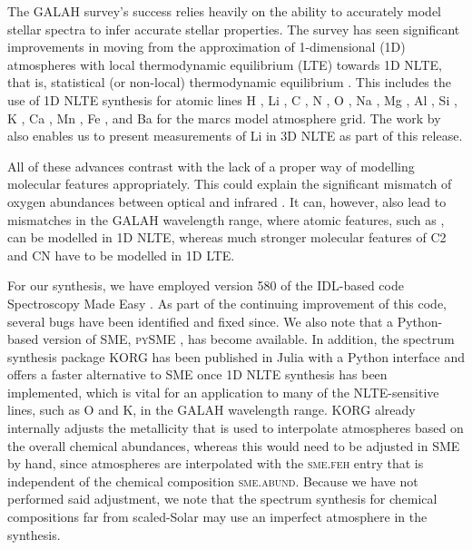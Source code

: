 \documentclass[
  journal=pasa,
  manuscript=research-paper, %
  year=2024,
  volume=37
]{cup-journal}
\newcommand\ion[2]{\text{#1\,\textsc{\lowercase{#2}}}}	%
\begin{document}
The GALAH survey's success relies heavily on the ability to accurately model stellar spectra to infer accurate stellar properties. The survey has seen significant improvements in moving from the approximation of 1-dimensional (1D) atmospheres with local thermodynamic equilibrium (LTE) towards 1D NLTE, that is, statistical (or non-local) thermodynamic equilibrium \citep{Amarsi2020}. This includes the use of 1D NLTE synthesis for atomic lines  H \citep{Amarsi2018}, Li \citep{Lind2009, Wang2020}, C \citep{Amarsi2019}, N \citep{Amarsi2020b}, O \citep{Amarsi2018b}, Na \citep{Lind2011}, Mg \citep{Osorio2015}, Al \citep{Nordlander2017}, Si \citep{Amarsi2017}, K \citep{Reggiani2019}, Ca \citep{Osorio2019}, Mn \citep{Bergemann2019b}, Fe \citep{Amarsi2018, Amarsi2022}, and Ba \citep{Gallagher2020} for the {\sc marcs} model atmosphere grid. The work by \citet{Wang2024} also enables us to present measurements of Li in 3D NLTE as part of this release.

All of these advances contrast with the lack of a proper way of modelling molecular features appropriately. This could explain the significant mismatch of oxygen abundances between optical and infrared \citep[compare e.g.][]{Bensby2014, SDSSDR17}. It can, however, also lead to mismatches in the GALAH wavelength range, where atomic features, such as \ion{C}{I}, can be modelled in 1D NLTE, whereas much stronger molecular features of C2 and CN have to be modelled in 1D LTE.

For our synthesis, we have employed version 580 of the IDL-based code Spectroscopy Made Easy \citep{Valenti1996, Piskunov2017}. As part of the continuing improvement of this code, several bugs have been identified and fixed since. We also note that a Python-based version of SME, \textsc{pySME} \citep{Wehrhahn2021}, has become available. In addition, the spectrum synthesis package \textsc{KORG} \citep{Wheeler2023, Wheeler2024} has been published in Julia with a Python interface and offers a faster alternative to SME once 1D NLTE synthesis has been implemented, which is vital for an application to many of the NLTE-sensitive lines, such as O and K, in the GALAH wavelength range. \textsc{KORG} already internally adjusts the metallicity that is used to interpolate atmospheres based on the overall chemical abundances, whereas this would need to be adjusted in \textsc{SME} by hand, since atmospheres are interpolated with the \textsc{sme.feh} entry that is independent of the chemical composition \textsc{sme.abund}. Because we have not performed said adjustment, we note that the spectrum synthesis for chemical compositions far from scaled-Solar may use an imperfect atmosphere in the synthesis.
\end{document}
